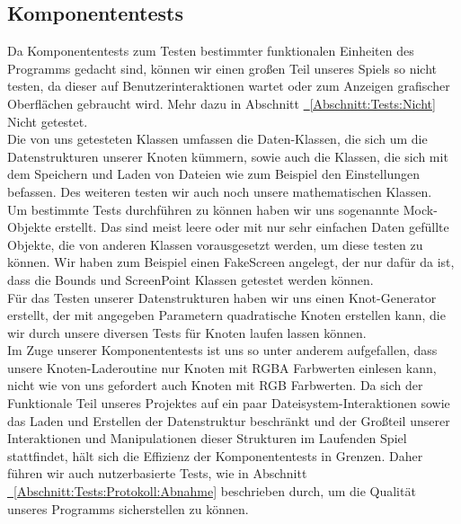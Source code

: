 %



\newpage



\label{Abschnitt:Tests:Protokoll:Komponenten}



\subsection*{Komponententests}


Da Komponententests zum Testen bestimmter funktionalen Einheiten des Programms gedacht sind, können wir einen großen Teil unseres Spiels so nicht testen, da dieser auf Benutzerinteraktionen wartet oder zum Anzeigen grafischer Oberflächen gebraucht wird. 
Mehr dazu in Abschnitt \hyperref[Abschnitt:Tests:Nicht:Komponenten]{\mousecursor~\ref{Abschnitt:Tests:Nicht}} \glqq Nicht getestet\grqq.\\

Die von uns getesteten Klassen umfassen die Daten-Klassen, die sich um die Datenstrukturen unserer Knoten kümmern, sowie auch die Klassen, die sich mit dem Speichern und Laden von Dateien wie zum Beispiel den Einstellungen befassen.
Des weiteren testen wir auch noch unsere mathematischen Klassen.\\

Um bestimmte Tests durchführen zu können haben wir uns sogenannte Mock-Objekte erstellt. Das sind meist leere oder mit nur sehr einfachen Daten gefüllte Objekte, die von anderen Klassen vorausgesetzt werden, um diese testen zu können. Wir haben zum Beispiel einen FakeScreen angelegt, der nur dafür da ist, dass die Bounds und ScreenPoint Klassen getestet werden können.\\

Für das Testen unserer Datenstrukturen haben wir uns einen Knot-Generator erstellt, der mit angegeben Parametern quadratische Knoten erstellen kann, die wir  durch unsere diversen Tests für Knoten laufen lassen können.\\

Im Zuge unserer Komponententests ist uns so unter anderem aufgefallen, dass unsere Knoten-Laderoutine nur Knoten mit RGBA Farbwerten einlesen kann, nicht wie von uns gefordert auch Knoten mit RGB Farbwerten. Da sich der Funktionale Teil unseres Projektes auf ein paar Dateisystem-Interaktionen sowie das Laden und Erstellen der Datenstruktur beschränkt und der Großteil unserer Interaktionen und Manipulationen dieser Strukturen im Laufenden Spiel stattfindet, hält sich die Effizienz der Komponententests in Grenzen. Daher führen wir auch nutzerbasierte Tests, wie in Abschnitt \hyperref[Abschnitt:Tests:Protokoll:Abnahme]{\mousecursor~\ref{Abschnitt:Tests:Protokoll:Abnahme}} beschrieben durch, um die Qualität unseres Programms sicherstellen zu können.

